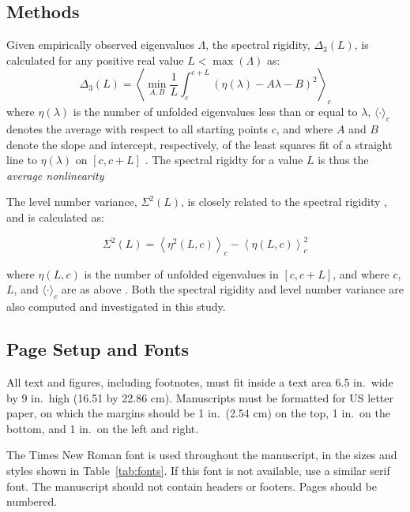 \documentclass[12pt]{spieman}  %
\begin{document}
\begin{spacing}{2}
\section{Methods}
\label{sect:methods}

Given empirically observed eigenvalues \(\Lambda\), the spectral rigidity, \(\Delta_3(L)\), is
calculated for any positive real value \(L < \max(\Lambda)\) as:
\[
\Delta_3(L) = \left \langle \min_{A,B} \frac{1}{L} \int_c^{c+L} \left(  \eta(\lambda) -A \lambda - B \right)^2 \right \rangle_c
\]
where \(\eta(\lambda)\) is the number of unfolded eigenvalues less than or equal to \(\lambda\),
\(\langle \cdot \rangle_c\) denotes the average with respect to all starting points \(c\), and where
\(A\) and \(B\) denote the slope and intercept, respectively, of the least squares fit of a straight
line to \(\eta(\lambda)\) on \([c, c+L]\) \cite{guhrRandommatrixTheoriesQuantum1998a}. The spectral
rigidty for a value \(L\) is thus the \textit{average nonlinearity}


The level
number variance, \(\Sigma^2(L)\), is closely related to the spectral rigidity
\cite{mehtaRandomMatrices2004}, and is calculated as:

\[
\Sigma^2(L) = \left\langle \eta^2(L, c) \right\rangle_c - \left\langle \eta(L, c) \right\rangle^2_c
\]

where \(\eta(L, c)\) is the number of unfolded eigenvalues in \([c, c+ L]\), and where \(c\), \(L\),
and \(\langle \cdot \rangle_c\) are as above \cite{guhrRandommatrixTheoriesQuantum1998a}. Both the
spectral rigidity and level number variance are also computed and investigated in this study.

\subsection{Page Setup and Fonts}

All text and figures, including footnotes, must fit inside a text area 6.5 in.\ wide by 9 in.\ high (16.51 by 22.86 cm). Manuscripts must be formatted for US letter paper, on which the margins should be 1 in.\ (2.54 cm) on the top, 1 in.\ on the bottom, and 1 in.\ on the left and right.

The Times New Roman font is used throughout the manuscript, in the sizes and styles shown in Table~\ref{tab:fonts}. If this font is not available, use a similar serif font. The manuscript should not contain headers or footers. Pages should be numbered.


\end{spacing}
\end{document}
